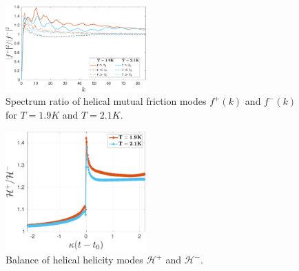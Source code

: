 \documentclass[%
 reprint,
 amsmath,amssymb,
 aps,
 prl,
]{revtex4-2}
\begin{document}
\blindtext[3] 

\begin{figure}
    \centering
    \includegraphics*[width=0.48\textwidth]{fmfDecompFig.pdf}
    \caption{Spectrum ratio of helical mutual friction modes $f^+(k)$ and $f^-(k)$ for $T=1.9K$ and $T=2.1K$.}
\end{figure}

\blindtext[3] 

\begin{figure}
    \centering
    \includegraphics*[width=0.48\textwidth]{hel-decomp.pdf}
    \caption{Balance of helical helicity modes $\mathcal{H}^+$ and $\mathcal{H}^-$. }
\end{figure}

\end{document}
